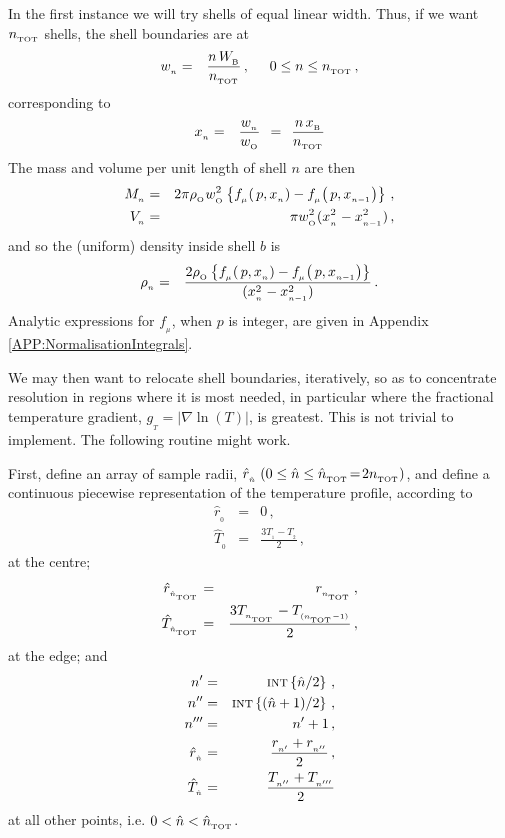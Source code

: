 \documentclass[usenatbib]{mn2e}
\newcommand{\subB}{_{_{\rm B}}}
\newcommand{\subO}{_{_{\rm O}}}
\numberwithin{equation}{section}
\begin{document}
In the first instance we will try shells of equal linear width. Thus, if we want $n_{_{\rm TOT}}$ shells, the shell boundaries are at
\begin{eqnarray}
w_{_n}&=&\frac{n\,W\subB}{n_{_{\rm TOT}}}\,,\hspace{0.5cm}0\leq n\leq n_{_{\rm TOT}}\,,
\end{eqnarray}
corresponding to
\begin{eqnarray}
x_{_n}&=&\frac{w_{_n}}{w\subO}\;\,=\;\,\frac{n\,x\subB}{n_{_{\rm TOT}}}
\end{eqnarray}
The mass and volume per unit length of shell $n$ are then
\begin{eqnarray}\label{EQN:Mn}
M_{_n}&=&2\pi\rho\subO w\subO^2 \left\{f_{_\mu}\!\left(\,p,x_{_n}\right)-f_{_\mu}\!\left(\,p,x_{_{n-1}}\right)\right\}\,,\\\label{EQN:Vn}
V_{_n}&=&\pi w\subO^2(x_{_n}^2-x_{_{n-1}}^2)\,,
\end{eqnarray}
and so the (uniform) density inside shell $b$ is
\begin{eqnarray}\label{EQN:rhon}
\rho_{_n}&=&\frac{2\rho\subO\left\{f_{_\mu}\!\left(\,p,x_{_n}\right)-f_{_\mu}\!\left(\,p,x_{_{n-1}}\right)\right\}}{(x_{_n}^2-x_{_{n-1}}^2)}\,.
\end{eqnarray}
Analytic expressions for $f_{_\mu}$, when $p$ is integer, are given in Appendix \ref{APP:NormalisationIntegrals}.

We may then want to relocate shell boundaries, iteratively, so as to concentrate resolution in regions where it is most needed, in particular where the fractional temperature gradient, $g_{_T}=|\nabla\ln(T)|$, is greatest. This is not trivial to implement. The following routine might work.

First, define an array of sample radii, ${\hat r}_{_{\hat n}}\;(0\leq{\hat n}\leq {\hat n}_{_{\rm TOT}}\!=\!2n_{_{\rm TOT}})$, and define a continuous piecewise representation of the temperature profile, according to
\begin{eqnarray}
{\hat r}_{_0}&=&0\,,\\
{\hat T}_{_0}&=&\frac{3T_{_1}-T_{_2}}{2}\,,
\end{eqnarray}
at the centre; 
\begin{eqnarray}
{\hat r}_{_{{\hat n}_{_{\rm TOT}}}}&=&r_{_{n_{_{\rm TOT}}}}\,,\\
{\hat T}_{_{{\hat n}_{_{\rm TOT}}}}&=&\frac{3T_{_{n_{_{\rm TOT}}}}-T_{_{(n_{_{\rm TOT}}-1)}}}{2}\,,
\end{eqnarray}
at the edge; and 
\begin{eqnarray}
n'&=&\mbox{\sc int}\left\{{\hat n}/2\right\}\,,\\
n''&=&\mbox{\sc int}\left\{({\hat n}+1)/2\right\}\,,\\
n'''&=&n'+1\,,\\
{\hat r}_{_{\hat n}}&=&\frac{r_{_{n'}}+r_{_{n''}}}{2}\,,\\
{\hat T}_{_{\hat n}}&=&\frac{T_{_{n''}}+T_{_{n'''}}}{2}
\end{eqnarray}
at all other points, i.e. $0<{\hat n}<{\hat n}_{_{\rm TOT}}$.
\end{document}
